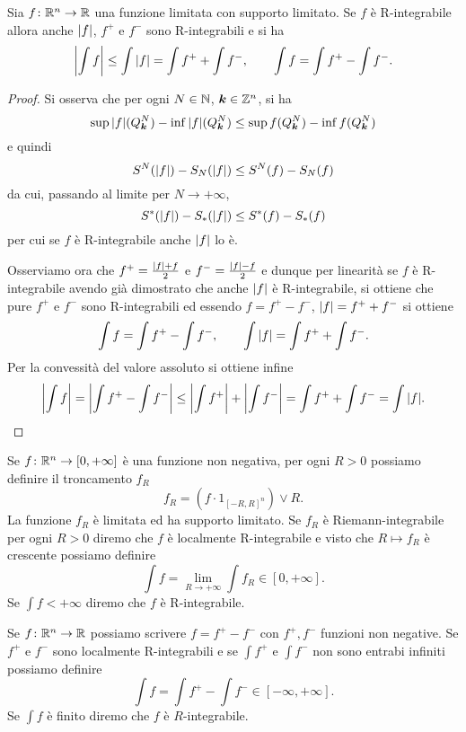 \begin{theorem}
Sia $f\colon {\mathbb R}^n \to {\mathbb R}$ una funzione limitata con supporto limitato.
Se $f$ è R-integrabile allora anche ${\left|f\right|}$, $f^+$ e $f^-$ sono 
R-integrabili e si ha 
\[
  {\left|\int f\right|} \le \int {\left|f\right|} = \int f^+ + \int f^-, 
  \qquad 
 \int f = \int f^+ - \int f^-.
\]
\end{theorem}
\begin{proof}
Si osserva che per ogni $N\in {\mathbb N}$, $\boldsymbol k \in {\mathbb Z}^n$, si ha 
\[
  \sup {\left|f\right|}(Q^N_{\boldsymbol k}) - \inf {\left|f\right|}(Q^N_{\boldsymbol k})
  \le 
  \sup f(Q^N_{\boldsymbol k}) - \inf f(Q^N_{\boldsymbol k})
\]
e quindi 
\[
   S^N({\left|f\right|}) - S_N({\left|f\right|}) \le S^N(f) - S_N(f)
\] 
da cui, passando al limite per $N\to +\infty$,
\[
  S^*({\left|f\right|}) - S_*({\left|f\right|}) \le S^*(f) - S_*(f)
\]
per cui se $f$ è R-integrabile anche ${\left|f\right|}$ lo è.

Osserviamo ora che $f^+=\frac{{\left|f\right|} + f}{2}$ e $f^-=\frac{{\left|f\right|} - f}{2}$ 
e dunque per linearità se $f$ è R-integrabile avendo già dimostrato 
che anche ${\left|f\right|}$ è R-integrabile, si ottiene che pure $f^+
$ e $f^-$ sono R-integrabili ed essendo $f=f^+-f^-$, ${\left|f\right|} = f^+ + f^-$ si ottiene 
\[
  \int f = \int f^+ - \int f^-, \qquad 
  \int {\left|f\right|} = \int f^+ + \int f^-.
\]
Per la convessità del valore assoluto si ottiene infine
\[
 {\left|\int f\right|} = {\left|\int f^+ - \int f^-\right|} 
 \le {\left|\int f^+\right|} + {\left|\int f^-\right|}
 = \int f^+ + \int f^- = \int {\left|f\right|}.
\]
\end{proof}

\begin{definition}
Se $f\colon {\mathbb R}^n \to [0,+\infty]$ è una funzione non negativa, per ogni $R>0$ 
possiamo definire il troncamento $f_R$ 
\[
  f_R = (f \cdot 1_{[-R,R]^n}) \vee R.
\]
La funzione $f_R$ è limitata ed ha supporto limitato.
Se $f_R$ è Riemann-integrabile per ogni $R>0$ diremo che $f$ è localmente R-integrabile 
e visto che $R\mapsto f_R$ è crescente possiamo definire
\[
 \int f = \lim_{R\to+\infty} \int f_R \in [0,+\infty].
\]
Se $\int f<+\infty$ diremo che $f$ è R-integrabile.

Se $f\colon {\mathbb R}^n\to {\mathbb R}$ possiamo scrivere $f= f^+-f^-$ con $f^+,f^-$ funzioni non negative.
Se $f^+$ e $f^-$ sono localmente R-integrabili e se 
$\int f^+$ e $\int f^-$ non sono entrabi infiniti possiamo definire 
\[
  \int f = \int f^+ - \int f^- \in [-\infty,+\infty].
\]
Se $\int f$ è finito diremo che $f$ è $R$-integrabile.
\end{definition}

